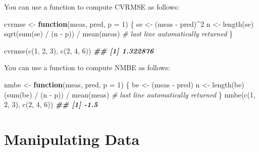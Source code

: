 \documentclass[
]{book}
\newenvironment{Shaded}{\begin{snugshade}}{\end{snugshade}}
\newcommand{\AttributeTok}[1]{\textcolor[rgb]{0.77,0.63,0.00}{#1}}
\newcommand{\CommentTok}[1]{\textcolor[rgb]{0.56,0.35,0.01}{\textit{#1}}}
\newcommand{\ControlFlowTok}[1]{\textcolor[rgb]{0.13,0.29,0.53}{\textbf{#1}}}
\newcommand{\DecValTok}[1]{\textcolor[rgb]{0.00,0.00,0.81}{#1}}
\newcommand{\DocumentationTok}[1]{\textcolor[rgb]{0.56,0.35,0.01}{\textbf{\textit{#1}}}}
\newcommand{\FunctionTok}[1]{\textcolor[rgb]{0.00,0.00,0.00}{#1}}
\newcommand{\NormalTok}[1]{#1}
\newcommand{\OtherTok}[1]{\textcolor[rgb]{0.56,0.35,0.01}{#1}}
\newcommand{\SpecialCharTok}[1]{\textcolor[rgb]{0.00,0.00,0.00}{#1}}
\begin{document}
You can use a function to compute CVRMSE as follows:

\begin{Shaded}
\begin{Highlighting}[]
\NormalTok{cvrmse }\OtherTok{\textless{}{-}} \ControlFlowTok{function}\NormalTok{(meas, pred, }\AttributeTok{p =} \DecValTok{1}\NormalTok{) \{}
\NormalTok{  se }\OtherTok{\textless{}{-}}\NormalTok{ (meas }\SpecialCharTok{{-}}\NormalTok{ pred)}\SpecialCharTok{\^{}}\DecValTok{2}
\NormalTok{  n }\OtherTok{\textless{}{-}} \FunctionTok{length}\NormalTok{(se)}
  \FunctionTok{sqrt}\NormalTok{(}\FunctionTok{sum}\NormalTok{(se) }\SpecialCharTok{/}\NormalTok{ (n }\SpecialCharTok{{-}}\NormalTok{ p)) }\SpecialCharTok{/} \FunctionTok{mean}\NormalTok{(meas) }\CommentTok{\# last line automatically returned}
\NormalTok{\}}

\FunctionTok{cvrmse}\NormalTok{(}\FunctionTok{c}\NormalTok{(}\DecValTok{1}\NormalTok{, }\DecValTok{2}\NormalTok{, }\DecValTok{3}\NormalTok{), }\FunctionTok{c}\NormalTok{(}\DecValTok{2}\NormalTok{, }\DecValTok{4}\NormalTok{, }\DecValTok{6}\NormalTok{))}
\DocumentationTok{\#\# [1] 1.322876}
\end{Highlighting}
\end{Shaded}

You can use a function to compute NMBE as follows:

\begin{Shaded}
\begin{Highlighting}[]
\NormalTok{nmbe }\OtherTok{\textless{}{-}} \ControlFlowTok{function}\NormalTok{(meas, pred, }\AttributeTok{p =} \DecValTok{1}\NormalTok{) \{}
\NormalTok{  be }\OtherTok{\textless{}{-}}\NormalTok{ (meas }\SpecialCharTok{{-}}\NormalTok{ pred)}
\NormalTok{  n }\OtherTok{\textless{}{-}} \FunctionTok{length}\NormalTok{(be)}
\NormalTok{  (}\FunctionTok{sum}\NormalTok{(be) }\SpecialCharTok{/}\NormalTok{ (n }\SpecialCharTok{{-}}\NormalTok{ p)) }\SpecialCharTok{/} \FunctionTok{mean}\NormalTok{(meas) }\CommentTok{\# last line automatically returned}
\NormalTok{\}}
\FunctionTok{nmbe}\NormalTok{(}\FunctionTok{c}\NormalTok{(}\DecValTok{1}\NormalTok{, }\DecValTok{2}\NormalTok{, }\DecValTok{3}\NormalTok{), }\FunctionTok{c}\NormalTok{(}\DecValTok{2}\NormalTok{, }\DecValTok{4}\NormalTok{, }\DecValTok{6}\NormalTok{))}
\DocumentationTok{\#\# [1] {-}1.5}
\end{Highlighting}
\end{Shaded}

\hypertarget{manipulate}{%
\chapter{Manipulating Data}\label{manipulate}}
\end{document}
